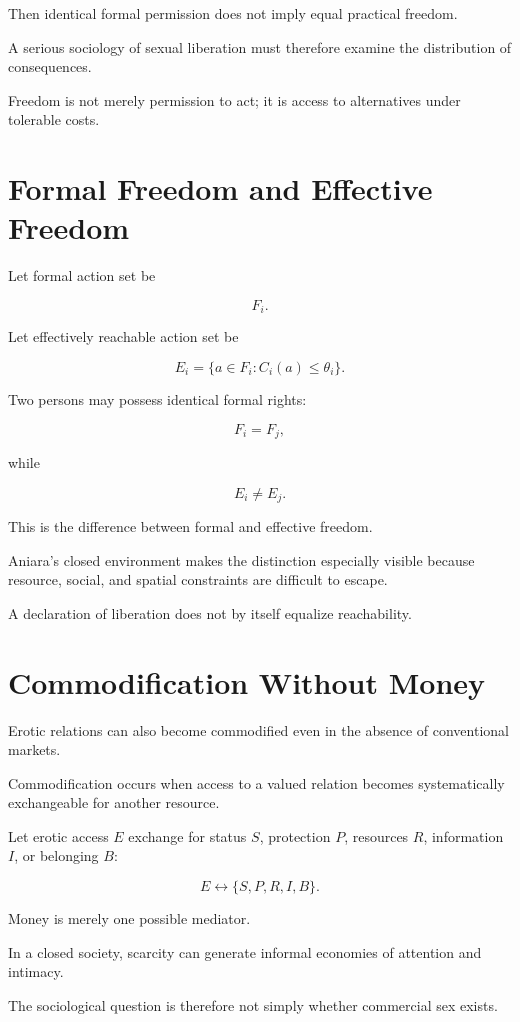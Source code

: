 \documentclass[11pt,oneside]{book}
\theoremstyle{definition}
\theoremstyle{remark}
\begin{document}
Then identical formal permission does not imply equal practical freedom.

A serious sociology of sexual liberation must therefore examine the distribution of consequences.

Freedom is not merely permission to act; it is access to alternatives under tolerable costs.

\section{Formal Freedom and Effective Freedom}

Let formal action set be

\[
F_i.
\]

Let effectively reachable action set be

\[
E_i
=
\{
a\in F_i:
C_i(a)\leq\theta_i
\}.
\]

Two persons may possess identical formal rights:

\[
F_i=F_j,
\]

while

\[
E_i\neq E_j.
\]

This is the difference between formal and effective freedom.

Aniara's closed environment makes the distinction especially visible because resource, social, and spatial constraints are difficult to escape.

A declaration of liberation does not by itself equalize reachability.

\section{Commodification Without Money}

Erotic relations can also become commodified even in the absence of conventional markets.

Commodification occurs when access to a valued relation becomes systematically exchangeable for another resource.

Let erotic access \(E\) exchange for status \(S\), protection \(P\), resources \(R\), information \(I\), or belonging \(B\):

\[
E
\leftrightarrow
\{S,P,R,I,B\}.
\]

Money is merely one possible mediator.

In a closed society, scarcity can generate informal economies of attention and intimacy.

The sociological question is therefore not simply whether commercial sex exists.
\end{document}
